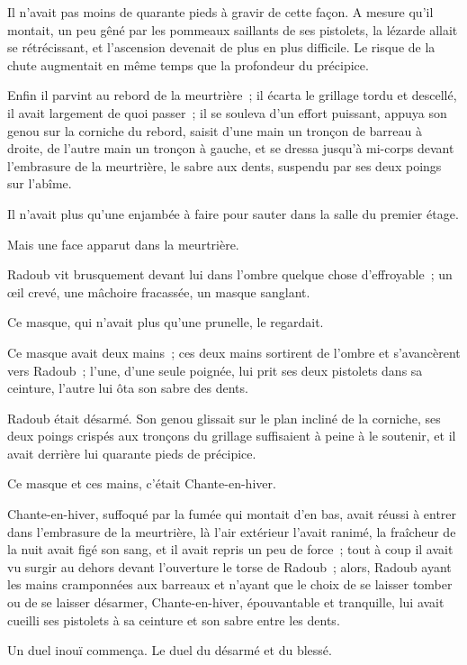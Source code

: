 \documentclass[french,twoside]{book} %
\begin{document}
Il n’avait pas moins de quarante pieds à gravir de cette façon. A mesure qu’il montait, un peu gêné par les pommeaux saillants de ses pistolets, la lézarde allait se rétrécissant, et l’ascension devenait de plus  en plus difficile. Le risque de la chute augmentait en même temps que la profondeur du précipice.\par
Enfin il parvint au rebord de la meurtrière ; il écarta le grillage tordu et descellé, il avait largement de quoi passer ; il se souleva d’un effort puissant, appuya son genou sur la corniche du rebord, saisit d’une main un tronçon de barreau à droite, de l’autre main un tronçon à gauche, et se dressa jusqu’à mi-corps devant l’embrasure de la meurtrière, le sabre aux dents, suspendu par ses deux poings sur l’abîme.\par
Il n’avait plus qu’une enjambée à faire pour sauter dans la salle du premier étage.\par
Mais une face apparut dans la meurtrière.\par
Radoub vit brusquement devant lui dans l’ombre quelque chose d’effroyable ; un œil crevé, une mâchoire fracassée, un masque sanglant.\par
Ce masque, qui n’avait plus qu’une prunelle, le regardait.\par
Ce masque avait deux mains ; ces deux mains sortirent de l’ombre et s’avancèrent vers Radoub ; l’une, d’une seule poignée, lui prit ses deux pistolets dans sa ceinture, l’autre lui ôta son sabre des dents.\par
Radoub était désarmé. Son genou glissait sur le plan incliné de la corniche, ses deux poings crispés aux tronçons du grillage suffisaient à peine à le soutenir, et il avait derrière lui quarante pieds de précipice.\par
Ce masque et ces mains, c’était Chante-en-hiver.\par
Chante-en-hiver, suffoqué par la fumée qui montait d’en bas, avait réussi à entrer dans l’embrasure de  la meurtrière, là l’air extérieur l’avait ranimé, la fraîcheur de la nuit avait figé son sang, et il avait repris un peu de force ; tout à coup il avait vu surgir au dehors devant l’ouverture le torse de Radoub ; alors, Radoub ayant les mains cramponnées aux barreaux et n’ayant que le choix de se laisser tomber ou de se laisser désarmer, Chante-en-hiver, épouvantable et tranquille, lui avait cueilli ses pistolets à sa ceinture et son sabre entre les dents.\par
Un duel inouï commença. Le duel du désarmé et du blessé.\par
\end{document}
